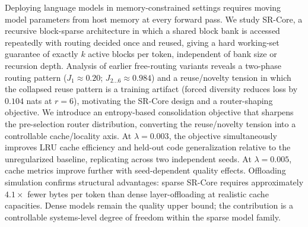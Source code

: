 Deploying language models in memory-constrained settings requires moving model parameters
from host memory at every forward pass.
We study SR-Core, a recursive block-sparse architecture in which a shared block bank is
accessed repeatedly with routing decided once and reused, giving a hard working-set
guarantee of exactly $k$ active blocks per token, independent of bank size or recursion
depth.
Analysis of earlier free-routing variants reveals a two-phase routing pattern
($J_1 \approx 0.20$; $J_{2\ldots6} \approx 0.984$) and a reuse/novelty tension in which
the collapsed reuse pattern is a training artifact (forced diversity reduces loss by
$0.104$ nats at $r{=}6$), motivating the SR-Core design and a router-shaping objective.
We introduce an entropy-based consolidation objective that sharpens the pre-selection
router distribution, converting the reuse/novelty tension into a controllable cache/locality
axis.
At $\lambda = 0.003$, the objective simultaneously improves LRU cache efficiency and
held-out code generalization relative to the unregularized baseline, replicating across two
independent seeds.
At $\lambda = 0.005$, cache metrics improve further with seed-dependent quality effects.
Offloading simulation confirms structural advantages: sparse SR-Core requires approximately
$4.1\times$ fewer bytes per token than dense layer-offloading at realistic cache capacities.
Dense models remain the quality upper bound; the contribution is a controllable
systems-level degree of freedom within the sparse model family.
